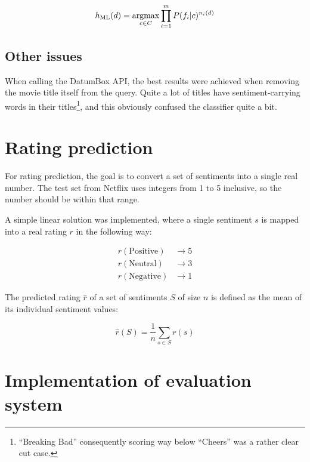 \begin{equation}
  h_{\text{ML}}(d) = \argmax_{c \in C} \prod_{i=1}^m P(f_i | c)^{n_i(d)}
\end{equation}

\subsection{Other issues}

When calling the DatumBox API, the best results were achieved when removing the movie title itself from the query. Quite a lot of titles have sentiment-carrying words in their titles\footnote{``Breaking Bad'' consequently scoring way below ``Cheers'' was a rather clear cut case.}, and this obviously confused the classifier quite a bit.



\section{Rating prediction} %
\label{sec:rating_prediction}

For rating prediction, the goal is to convert a set of sentiments into a single real number. The test set from Netflix uses integers from 1 to 5 inclusive, so the number should be within that range.

A simple linear solution was implemented, where a single sentiment $s$ is mapped into a real rating $r$ in the following way:

\begin{align*}
  r(\text{Positive}) &\rightarrow 5 \\
  r(\text{Neutral})  &\rightarrow 3 \\
  r(\text{Negative}) &\rightarrow 1
\end{align*}

The predicted rating $\hat{r}$ of a set of sentiments $S$ of size $n$ is defined as the mean of its individual sentiment values:

\begin{equation}
  \hat{r}(S) = \frac{1}{n} \sum_{s \in S} r(s)
\end{equation}


\section{Implementation of evaluation system} %
\label{sec:evaluation_impl}

